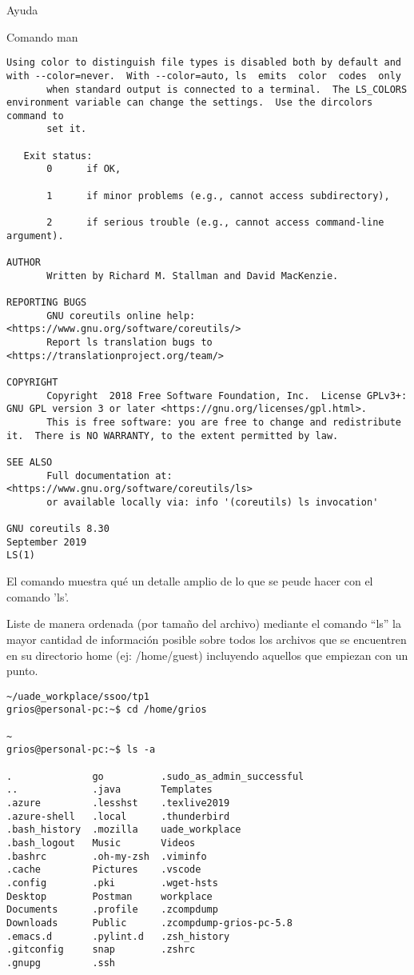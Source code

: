 \begin{section}{Ayuda}
\begin{subsection}{Comando man}
\begin{lstlisting}[style=Ubuntu]
       Using color to distinguish file types is disabled both by default and with --color=never.  With --color=auto, ls  emits  color  codes  only
       when standard output is connected to a terminal.  The LS_COLORS environment variable can change the settings.  Use the dircolors command to
       set it.

   Exit status:
       0      if OK,

       1      if minor problems (e.g., cannot access subdirectory),

       2      if serious trouble (e.g., cannot access command-line argument).

AUTHOR
       Written by Richard M. Stallman and David MacKenzie.

REPORTING BUGS
       GNU coreutils online help: <https://www.gnu.org/software/coreutils/>
       Report ls translation bugs to <https://translationproject.org/team/>

COPYRIGHT
       Copyright  2018 Free Software Foundation, Inc.  License GPLv3+: GNU GPL version 3 or later <https://gnu.org/licenses/gpl.html>.
       This is free software: you are free to change and redistribute it.  There is NO WARRANTY, to the extent permitted by law.

SEE ALSO
       Full documentation at: <https://www.gnu.org/software/coreutils/ls>
       or available locally via: info '(coreutils) ls invocation'

GNU coreutils 8.30                                                September 2019                                                             LS(1)

\end{lstlisting}
El comando muestra qué un detalle amplio de lo que se peude hacer con el comando 'ls'.\\

\begin{quoting}
Liste de manera ordenada (por tamaño del archivo) mediante el comando “ls” la mayor cantidad de información posible sobre todos los archivos que se encuentren en su directorio home (ej: /home/guest) incluyendo aquellos que empiezan con un punto.
\end{quoting}

\begin{lstlisting}[style=Ubuntu]
~/uade_workplace/ssoo/tp1
grios@personal-pc:~$ cd /home/grios

~
grios@personal-pc:~$ ls -a

.              go          .sudo_as_admin_successful
..             .java       Templates
.azure         .lesshst    .texlive2019
.azure-shell   .local      .thunderbird
.bash_history  .mozilla    uade_workplace
.bash_logout   Music       Videos
.bashrc        .oh-my-zsh  .viminfo
.cache         Pictures    .vscode
.config        .pki        .wget-hsts
Desktop        Postman     workplace
Documents      .profile    .zcompdump
Downloads      Public      .zcompdump-grios-pc-5.8
.emacs.d       .pylint.d   .zsh_history
.gitconfig     snap        .zshrc
.gnupg         .ssh


\end{lstlisting}
\end{subsection}
\end{section}

